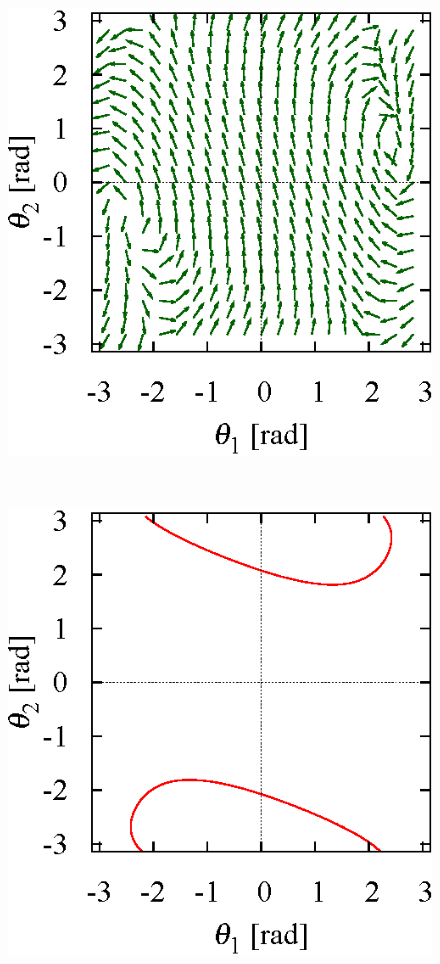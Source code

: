 \begin{figure}[t]
\begin{minipage}[t]{0.30\linewidth}
    \hspace{2mm}
  \end{minipage}
  \begin{minipage}[t]{0.30\linewidth}
    \centering
    \includegraphics[width=1.0\linewidth]{fig/chapter3/planar/1.5.eps}
    \hspace{2mm}
  \end{minipage}\\
  \vspace{-3mm}
  \begin{minipage}[t]{0.30\linewidth}
    \centering
    \includegraphics[width=1.0\linewidth]{fig/chapter3/planar/0.5_nullclines.eps}

\end{minipage}
\end{figure}
